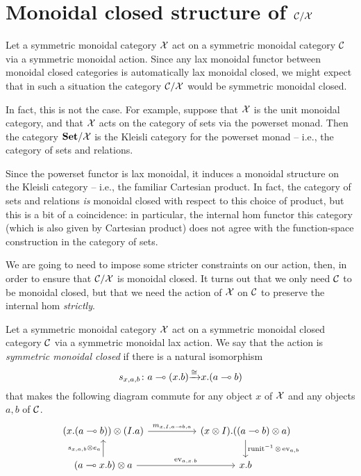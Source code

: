 \section{Monoidal closed structure of ${\mathcal{C}}/\mathcal X$}

Let a symmetric monoidal category $\mathcal X$ act on a symmetric monoidal category ${\mathcal{C}}$ via a symmetric monoidal action.  
Since any lax monoidal functor between monoidal closed categories is automatically lax monoidal closed, we might expect that in such a situation the category ${\mathcal{C}}/\mathcal X$ would be symmetric monoidal closed.

In fact, this is not the case.  
For example, suppose that $\mathcal X$ is the unit monoidal category, and that $\mathcal X$ acts on the category of sets via the powerset monad.  
Then the category ${\normalfont\textbf{Set}}/\mathcal X$ is the Kleisli category for the powerset monad -- i.e., the category of sets and relations.  

Since the powerset functor is lax monoidal, it induces a monoidal structure on the Kleisli category -- i.e., the familiar Cartesian product.  
In fact, the category of sets and relations \emph{is} monoidal closed with respect to this choice of product, but this is a bit of a coincidence: in particular, the internal hom functor this category (which is also given by Cartesian product) does not agree with the function-space construction in the category of sets.

We are going to need to impose some stricter constraints on our action, then, in order to ensure that ${\mathcal{C}}/\mathcal X$ is monoidal closed.  
It turns out that we only need ${\mathcal{C}}$ to be monoidal closed, but that we need the action of $\mathcal X$ on ${\mathcal{C}}$ to preserve the internal hom \emph{strictly}.

\begin{definition}
  Let a symmetric monoidal category $\mathcal X$ act on a symmetric monoidal closed category ${\mathcal{C}}$ via a symmetric monoidal lax action.
  We say that the action is \emph{symmetric monoidal closed} if there is a natural isomorphism
  \[
    s_{x,a,b} \colon a\multimap (x.b) {\xrightarrow{\cong}} x.(a\multimap b)
    \]
  that makes the following diagram commute for any object $x$ of $\mathcal X$ and any objects $a,b$ of ${\mathcal{C}}$.
  \[
    \begin{tikzcd}[column sep=50pt]
      (x.(a\implies b)) \tensor (I.a) \arrow[r, "{m_{x,I,a\implies b,a}}"]
        & (x \tensor I).((a\implies b)\tensor a) \arrow[d, "{\runit\inv\tensor \ev_{a,b}}"] \\
      (a \implies x.b)\tensor a \arrow[u, "{s_{x,a,b}\tensor e_a}"] \arrow[r, "{\ev_{a,x.b}}"]
        & x.b
    \end{tikzcd}
    \]
  \label{DefSymmetricMonoidalClosedAction}
\end{definition}

